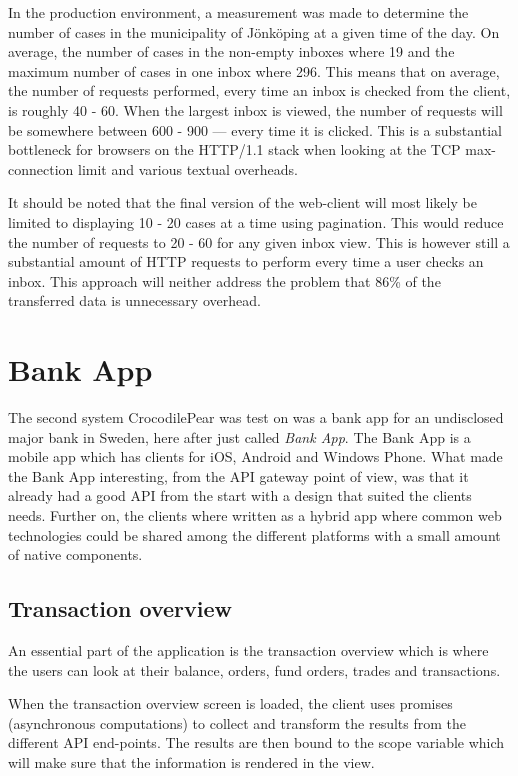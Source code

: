 \documentclass{cslthse-msc}
\begin{document}
In the production environment, a measurement was made to determine the number of cases in the municipality of Jönköping at a given time of the day. On average, the number of cases in the non-empty inboxes where 19 and the maximum number of cases in one inbox where 296. This means that on average, the number of requests performed, every time an inbox is checked from the client, is roughly 40 - 60. When the largest inbox is viewed, the number of requests will be somewhere between 600 - 900 --- every time it is clicked. This is a substantial bottleneck for browsers on the HTTP/1.1 stack when looking at the TCP max-connection limit and various textual overheads.

It should be noted that the final version of the web-client will most likely be limited to displaying 10 - 20 cases at a time using pagination. This would reduce the number of requests to 20 - 60 for any given inbox view. This is however still a substantial amount of HTTP requests to perform every time a user checks an inbox. This approach will neither address the problem that 86\% of the transferred data is unnecessary overhead.

\newpage
\section{Bank App}
The second system CrocodilePear was test on was a bank app for an undisclosed major bank in Sweden, here after just called \textit{Bank App}. The Bank App is a mobile app which has clients for iOS, Android and Windows Phone. What made the Bank App interesting, from the API gateway point of view, was that it already had a good API from the start with a design that suited the clients needs. Further on, the clients where written as a hybrid app where common web technologies could be shared among the different platforms with a small amount of native components.

\subsection{Transaction overview}
An essential part of the application is the transaction overview which is where the users can look at their balance, orders, fund orders, trades and transactions.

When the transaction overview screen is loaded, the client uses promises (asynchronous computations) to collect and transform the results from the different API end-points. The results are then bound to the scope variable which will make sure that the information is rendered in the view.
\end{document}
